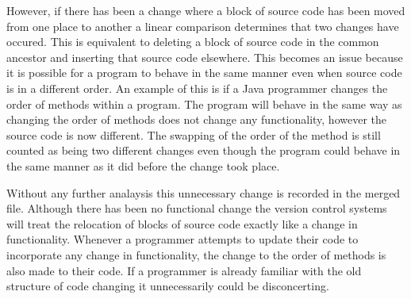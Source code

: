 

However, if there has been a change where a block of source code has been moved from one place to another a linear comparison determines that two changes have occured.  This is equivalent to deleting a block of source code in the common ancestor and inserting that source code elsewhere. This becomes an issue because it is possible for a program to behave in the same manner even when source code is in a different order.  An example of this is if a Java programmer changes the order of methods within a program.  The program will behave in the same way as changing the order of methods does not change any functionality, however the source code is now different. The swapping of the order of the method is still counted as being two different changes even though the program could behave in the same manner as it did before the change took place.

Without any further analaysis this unnecessary change is recorded in the merged file.  Although there has been no functional change the version control systems will treat the relocation of blocks of source code exactly like a change in functionality.  Whenever a programmer attempts to update their code to incorporate any change in functionality, the change to the order of methods is also made to their code.  If a programmer is already familiar with the old structure of code changing it unnecessarily could be disconcerting.   

